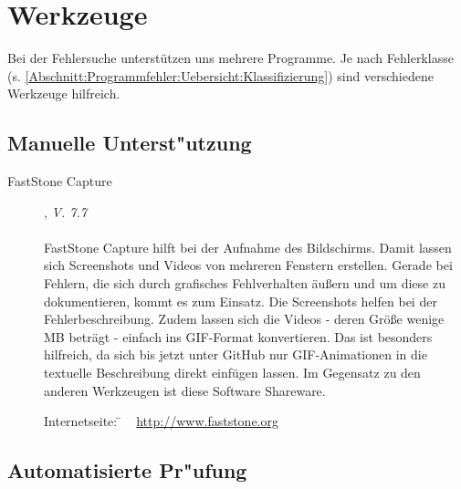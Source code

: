 %



\section{Werkzeuge}
\label{Abschnitt:Programmfehler:Werkzeuge}

Bei der Fehlersuche unterstützen uns mehrere Programme.
Je nach Fehlerklasse (s. \ref{Abschnitt:Programmfehler:Uebersicht:Klassifizierung}) sind verschiedene Werkzeuge hilfreich.





\subsection{Manuelle Unterst{"u}tzung}
\label{Abschnitt:Programmfehler:Werkzeuge:Manuell}


\begin{description}

	\item[FastStone Capture], \textit{V. 7.7}\hfill
		\\
		\\
		FastStone Capture hilft bei der Aufnahme des Bildschirms. Damit lassen sich Screenshots und Videos von mehreren Fenstern erstellen. Gerade bei Fehlern, die sich durch grafisches Fehlverhalten äußern und um diese zu dokumentieren, kommt es zum Einsatz. Die Screenshots helfen bei der Fehlerbeschreibung. Zudem lassen sich die Videos - deren Größe wenige MB beträgt - einfach ins GIF-Format konvertieren. Das ist besonders hilfreich, da sich bis jetzt unter GitHub nur GIF-Animationen in die textuelle Beschreibung direkt einfügen lassen. Im Gegensatz zu den anderen Werkzeugen ist diese Software Shareware.
		
		\begin{tabbing}
			Internetseite:
			\= ~ \href {http://www.faststone.org}
		    	       {http://www.faststone.org}
		    \\
		\end{tabbing}

\end{description}




\subsection{Automatisierte Pr{"u}fung}
\label{Abschnitt:Programmfehler:Werkzeuge:Automatisiert}







